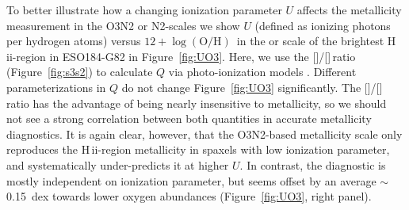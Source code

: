 \documentclass[traditabstract]{aa}
\newcommand{\hii}{\mbox{H\,{\sc ii}}}
\newcommand{\oh}{$12+\log(\mathrm{O/H})$}
\newcommand{\sii}{[\ion{S}{ii}]}
\newcommand{\siii}{[\ion{S}{iii}]}
\begin{document}
\begin{appendix}
To better illustrate how a changing ionization parameter $U$ affects the metallicity measurement in the O3N2 or N2-scales we show $U$ (defined as ionizing photons per hydrogen atoms) versus \oh\, in the \citet{2004MNRAS.348L..59P} or \citet{2016Ap&SS.361...61D} scale of the brightest \hii-region in ESO184-G82 in Figure~\ref{fig:UO3}. Here, we use the \sii/\siii\,ratio (Figure~\ref{fig:s3s2}) to calculate $Q$ via photo-ionization models \citep{2011MNRAS.415.3616D}. Different parameterizations in $Q$ \citep[e.g.][]{2016A&A...594A..37M} do not change Figure~\ref{fig:UO3} significantly. The \sii/\siii\,ratio has the advantage of being nearly insensitive to metallicity, so we should not see a strong correlation between both quantities in accurate metallicity diagnostics. It is again clear, however, that the O3N2-based metallicity scale only reproduces the \hii-region metallicity in spaxels with low ionization parameter, and systematically under-predicts it at higher $U$. In contrast, the \citet{2016Ap&SS.361...61D} diagnostic is mostly independent on ionization parameter, but seems offset by an average $\sim$0.15~dex towards lower oxygen abundances (Figure~\ref{fig:UO3}, right panel).

\end{appendix}
\end{document}
